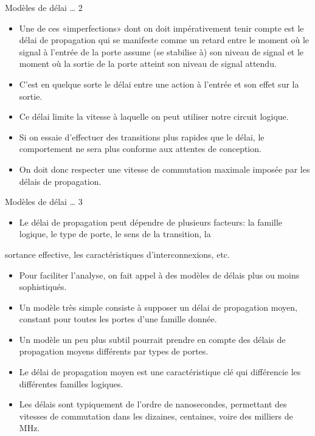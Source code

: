 \documentclass[presentation]{beamer}
\begin{document}
\begin{frame}[label={sec:org0ca5e26}]{Modèles de délai \ldots{} 2}
\begin{itemize}
\item Une de ces «imperfections» dont on doit impérativement tenir compte est le \alert{délai de propagation} qui se manifeste comme un retard entre le moment où le signal à l'entrée de la porte assume (se stabilise à) son niveau de signal et le moment où la sortie de la porte atteint son niveau de signal attendu.

\item C'est en quelque sorte le délai entre une action à l'entrée et son effet sur la sortie.

\item Ce délai limite la vitesse à laquelle on peut utiliser notre circuit logique.

\item Si on essaie d'effectuer des transitions plus rapides que le délai, le comportement ne sera plus conforme aux attentes de conception.

\item On doit donc respecter une vitesse de commutation maximale imposée par les délais de propagation.
\end{itemize}
\end{frame}

\begin{frame}[label={sec:orgcb645c0}]{Modèles de délai \ldots{} 3}
\begin{itemize}
\item Le délai de propagation peut dépendre de plusieurs facteurs: la famille logique, le type de porte, le sens de la transition, la
\end{itemize}
sortance effective, les caractéristiques d'interconnexions, etc.

\begin{itemize}
\item Pour faciliter l'analyse, on fait appel à des modèles de délais plus ou moins sophistiqués.

\item Un modèle très simple consiste à supposer un délai de propagation moyen, constant pour toutes les portes d'une famille donnée.

\item Un modèle un peu plus subtil pourrait prendre en compte des délais de propagation moyens différents par types de portes.

\item Le délai de propagation moyen est une caractéristique clé qui différencie les différentes familles logiques.

\item Les délais sont typiquement de l'ordre de nanosecondes, permettant des vitesses de commutation dans les dizaines, centaines, voire des milliers de MHz.
\end{itemize}
\end{frame}
\end{document}
